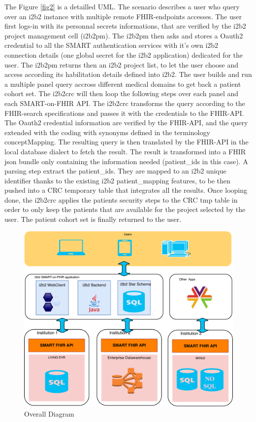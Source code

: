 \documentclass{amia}
\begin{document}
The Figure \ref{fig2} is a detailled UML. The scenario describes a user who query over an i2b2 instance with multiple remote FHIR-endpoints accesses. 
The user first logs-in with its personnal secrets informations, that are verified by the i2b2 project management cell (i2b2pm). The i2b2pm then asks and stores a Oauth2 credential to all the SMART authentication services with it's own i2b2 connection details (one global secret for the i2b2 application) dedicated for the user. The i2b2pm returns then an i2b2 project list, to let the user choose and access according its habilitation details defined into i2b2. The user builds and run a multiple panel query accross different medical domains to get back a patient cohort set. The i2b2crc will then loop the following steps over each panel and each SMART-on-FHIR API. The i2b2crc transforms the query according to the FHIR-search specifications  and passes it with the credentials to the FHIR-API. The Oauth2 credential information are verified by the FHIR-API, and the query extended with the coding with synonyms defined in the terminology conceptMapping. The resulting query is then translated by the FHIR-API in the local database dialect to fetch the result. The result is transformed into a FHIR json bundle only containing the information needed (patient\_ids in this case). A parsing step extract the patient\_ids. They are mapped to an i2b2 unique identifier thanks to the existing i2b2 patient\_mapping features, to be then pushed into a CRC temporary table that integrates all the results. Once looping done, the i2b2crc applies the patients security steps to the CRC tmp table in order to only keep the patients that are available for the project selected by the user. The patient cohort set is finally returned to the user.

\begin{figure}[h!]
\centering
\includegraphics[scale=.4]{overall.pdf}
	\caption{Overall Diagram}
\label{fig1}
\end{figure}
\end{document}
